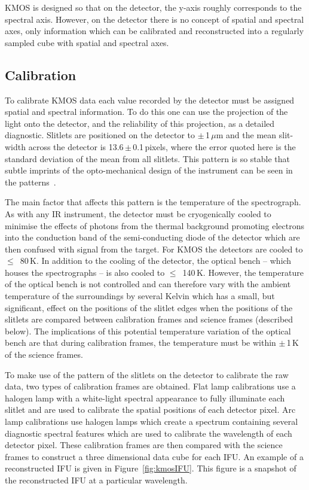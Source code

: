 KMOS is designed so that on the detector, the y-axis roughly corresponds to the spectral axis.
However, on the detector there is no concept of spatial and spectral axes,
only information which can be calibrated and reconstructed into a regularly sampled cube with spatial and spectral axes.


\subsection{Calibration} %
\label{sub:calibration}

To calibrate KMOS data each value recorded by the detector must be assigned spatial and spectral information.
To do this one can use the projection of the light onto the detector, and the reliability of this projection, as a detailed diagnostic.
Slitlets are positioned on the detector to $\pm$\,1\,$\mu$m
\citep[roughly 1/18$^{\rm th}$ of a pixel;][]{2013A&A...558A..56D} and
the mean slit-width across the detector is 13.6\,$\pm$\,0.1\,pixels,
where the error quoted here is the standard deviation of the mean from all slitlets.
This pattern is so stable that subtle imprints of the opto-mechanical design of the instrument can be seen in the patterns~\citep[see Fig. 2 of ][]{2013A&A...558A..56D}.

The main factor that affects this pattern is the temperature of the spectrograph.
As with any IR instrument, the detector must be cryogenically cooled to minimise the effects of photons from the thermal background promoting electrons into the conduction band of the semi-conducting diode of the detector which are then confused with signal from the target.
For KMOS the detectors are cooled to $\le$~80\,K.
In addition to the cooling of the detector, the optical bench -- which houses the spectrographs -- is also cooled to $\le$~140\,K.
However, the temperature of the optical bench is not controlled and can therefore vary with the ambient temperature of the surroundings by several Kelvin which has a small, but significant, effect on the positions of the slitlet edges when the positions of the slitlets are compared between calibration frames and science frames (described below).
The implications of this potential temperature variation of the optical bench are that during calibration frames, the temperature must be within $\pm$\,1\,K of the science frames.

To make use of the pattern of the slitlets on the detector to calibrate the raw data, two types of calibration frames are obtained.
Flat lamp calibrations use a halogen lamp with a white-light spectral appearance to fully illuminate each slitlet and are used to calibrate the spatial positions of each detector pixel.
Arc lamp calibrations use halogen lamps which create a spectrum containing several diagnostic spectral features which are used to calibrate the wavelength of each detector pixel.
These calibration frames are then compared with the science frames to construct a three dimensional data cube for each IFU.
An example of a reconstructed IFU is given in Figure~\ref{fig:kmosIFU}.
This figure is a snapshot of the reconstructed IFU at a particular wavelength.

